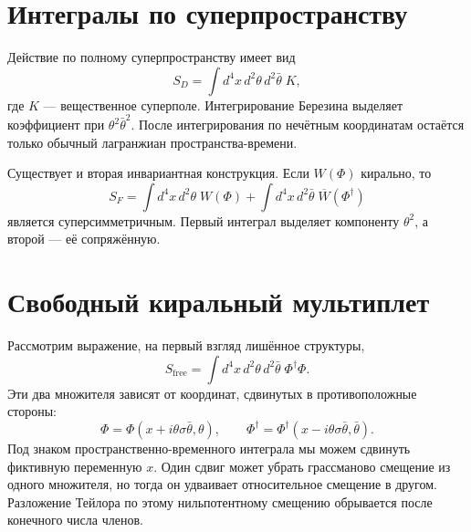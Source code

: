\section{Интегралы по суперпространству}

Действие по полному суперпространству имеет вид
\begin{equation}
S_D=\int d^4x\,d^2\theta\,d^2\bar\theta\;K,
\label{eq:l8-D-term-action}
\end{equation}
где \(K\) — вещественное суперполе. Интегрирование Березина выделяет коэффициент при \(\theta^2\bar\theta^2\). После интегрирования по нечётным координатам остаётся только обычный лагранжиан пространства-времени.

Существует и вторая инвариантная конструкция. Если \(W(\Phi)\) кирально, то
\begin{equation}
S_F=\int d^4x\,d^2\theta\;W(\Phi)
+\int d^4x\,d^2\bar\theta\;\overline{W}(\Phi^\dagger)
\label{eq:l8-F-term-action}
\end{equation}
является суперсимметричным. Первый интеграл выделяет компоненту \(\theta^2\), а второй — её сопряжённую.

\begin{classroomqa}
\end{classroomqa}

\section{Свободный киральный мультиплет}

Рассмотрим выражение, на первый взгляд лишённое структуры,
\begin{equation}
S_{\mathrm{free}}
=\int d^4x\,d^2\theta\,d^2\bar\theta\;
\Phi^\dagger\Phi.
\label{eq:l8-free-superaction}
\end{equation}
Эти два множителя зависят от координат, сдвинутых в противоположные стороны:
\begin{equation}
\Phi=\Phi(x+i\theta\sigma\bar\theta,\theta),
\qquad
\Phi^\dagger
=\Phi^\dagger(x-i\theta\sigma\bar\theta,\bar\theta).
\end{equation}
Под знаком пространственно-временного интеграла мы можем сдвинуть фиктивную переменную \(x\). Один сдвиг может убрать грассманово смещение из одного множителя, но тогда он удваивает относительное смещение в другом. Разложение Тейлора по этому нильпотентному смещению обрывается после конечного числа членов.

